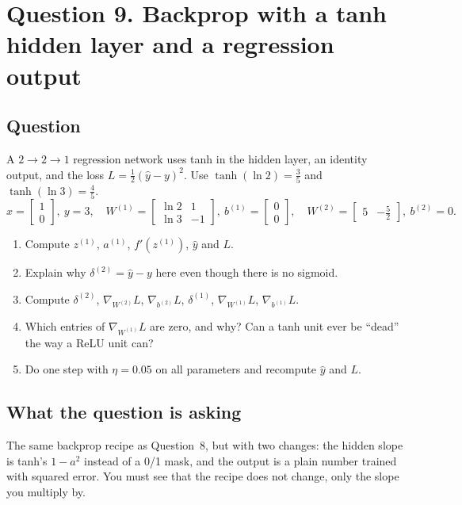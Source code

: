 \documentclass[12pt,a4paper]{article}
\begin{document}
\section{Question 9. Backprop with a tanh hidden layer and a regression output}
\subsection*{Question}
A $2\to2\to1$ regression network uses tanh in the hidden layer, an identity output, and the loss $L=\tfrac12(\hat y-y)^2$. Use $\tanh(\ln2)=\tfrac35$ and $\tanh(\ln3)=\tfrac45$.
\[
x=\begin{bmatrix}1\\0\end{bmatrix},\ y=3,\quad
W^{(1)}=\begin{bmatrix}\ln2&1\\ \ln3&-1\end{bmatrix},\ b^{(1)}=\begin{bmatrix}0\\0\end{bmatrix},\quad
W^{(2)}=\begin{bmatrix}5&-\tfrac52\end{bmatrix},\ b^{(2)}=0 .
\]
\begin{enumerate}[label=(\alph*)]
\item Compute $z^{(1)}$, $a^{(1)}$, $f'(z^{(1)})$, $\hat y$ and $L$.
\item Explain why $\delta^{(2)}=\hat y-y$ here even though there is no sigmoid.
\item Compute $\delta^{(2)}$, $\nabla_{W^{(2)}}L$, $\nabla_{b^{(2)}}L$, $\delta^{(1)}$, $\nabla_{W^{(1)}}L$, $\nabla_{b^{(1)}}L$.
\item Which entries of $\nabla_{W^{(1)}}L$ are zero, and why? Can a tanh unit ever be ``dead'' the way a ReLU unit can?
\item Do one step with $\eta=0.05$ on all parameters and recompute $\hat y$ and $L$.
\end{enumerate}

\subsection*{What the question is asking}
The same backprop recipe as Question~8, but with two changes: the hidden slope is tanh's $1-a^2$ instead of a 0/1 mask, and the output is a plain number trained with squared error. You must see that the recipe does not change, only the slope you multiply by.
\end{document}

